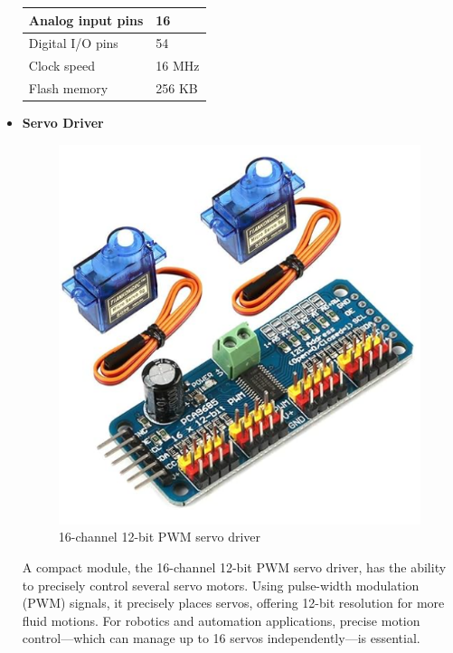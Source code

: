 \documentclass[12pt,a4paper]{report}
\begin{document}
\begin{itemize}
\begin{table}[H]
\begin{center}
\begin{tabular}{| p{5cm} | p{5cm} |}
Analog input pins
& 16 \\ \hline

Digital I/O pins
& 54 \\ \hline

Clock speed
& 16 MHz \\ \hline

Flash memory
& 256 KB \\ \hline
\end{tabular}
\end{center}
\end{table}


\newpage
\item {\bf{Servo Driver}}
\begin{figure}[!htb]
\begin{center}
\includegraphics[scale=0.5]{images/hardware/16channel PWM.png}
\caption{16-channel 12-bit PWM servo driver}
\end{center}
\end{figure}

\par A compact module, the 16-channel 12-bit PWM servo driver, has the ability to precisely control several servo motors. Using pulse-width modulation (PWM) signals, it precisely places servos, offering 12-bit resolution for more fluid motions. For robotics and automation applications, precise motion control—which can manage up to 16 servos independently—is essential.


\end{itemize}
\end{document}
